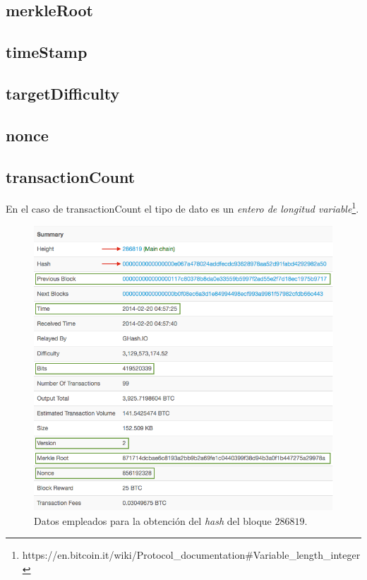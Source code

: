 \documentclass{article}
\begin{document}
    \subsection{merkleRoot}
    \subsection{timeStamp}
    \subsection{targetDifficulty}
    \subsection{nonce}
    \subsection{transactionCount}
    En el caso de transactionCount el tipo de dato es un \textit{entero de longitud variable}\footnote{https://en.bitcoin.it/wiki/Protocol\_documentation\#Variable\_length\_integer}.
    
    \begin{figure}[H]
    \centering
        \includegraphics[scale=0.47]{img/Bitcoin_block_SHA_256_Block_Data}
        \caption{Datos empleados para la obtención del \textit{hash} del bloque $286819$.}
    \end{figure}
    
\end{document}
